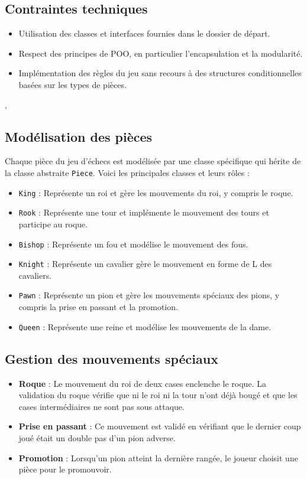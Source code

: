 \documentclass[12pt]{report}
\begin{document}
    \subsection*{Contraintes techniques}
    \begin{itemize}
        \item Utilisation des classes et interfaces fournies dans le dossier de départ.
        \item Respect des principes de POO, en particulier l'encapsulation et la modularité.
        \item Implémentation des règles du jeu sans recours à des structures conditionnelles basées sur les types de pièces.
    \end{itemize}

    ,
    \subsection*{Modélisation des pièces}
    Chaque pièce du jeu d'échecs est modélisée par une classe spécifique qui hérite de la classe abstraite \texttt{Piece}. Voici les principales classes et leurs rôles :
    \begin{itemize}
        \item \texttt{King} : Représente un roi et gère les mouvements du roi, y compris le roque.
        \item \texttt{Rook} : Représente une tour et implémente le mouvement des tours et participe au roque.
        \item \texttt{Bishop} : Représente un fou et modélise le mouvement des fous.
        \item \texttt{Knight} : Représente un cavalier gère le mouvement en forme de L des cavaliers.
        \item \texttt{Pawn} : Représente un pion et gère les mouvements spéciaux des pions, y compris la prise en passant et la promotion.
        \item \texttt{Queen} : Représente une reine et modélise les mouvements de la dame.
    \end{itemize}


    \subsection*{Gestion des mouvements spéciaux}
    \begin{itemize}
        \item \textbf{Roque} : Le mouvement du roi de deux cases enclenche le roque. La validation du roque vérifie que ni le roi ni la tour n'ont déjà bougé et que les cases intermédiaires ne sont pas sous attaque.
        \item \textbf{Prise en passant} : Ce mouvement est validé en vérifiant que le dernier coup joué était un double pas d'un pion adverse.
        \item \textbf{Promotion} : Lorsqu'un pion atteint la dernière rangée, le joueur choisit une pièce pour le promouvoir.
    \end{itemize}
\end{document}
